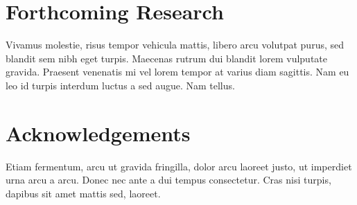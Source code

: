 \documentclass[a0,landscape]{a0poster}
\begin{document}
\begin{multicols}{4}
\section*{Forthcoming Research}

Vivamus molestie, risus tempor vehicula mattis, libero arcu volutpat purus, sed blandit sem nibh eget turpis. Maecenas rutrum dui blandit lorem vulputate gravida. Praesent venenatis mi vel lorem tempor at varius diam sagittis. Nam eu leo id turpis interdum luctus a sed augue. Nam tellus.


\nocite{*} %


\section*{Acknowledgements}

Etiam fermentum, arcu ut gravida fringilla, dolor arcu laoreet justo, ut imperdiet urna arcu a arcu. Donec nec ante a dui tempus consectetur. Cras nisi turpis, dapibus sit amet mattis sed, laoreet.


\end{multicols}
\end{document}
